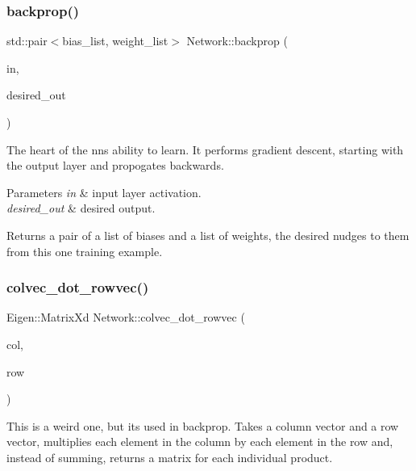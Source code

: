 \subsubsection{\texorpdfstring{backprop()}{backprop()}}
{\footnotesize\ttfamily std\+::pair$<$bias\+\_\+list, weight\+\_\+list$>$ Network\+::backprop (\begin{DoxyParamCaption}\item[{Eigen\+::\+Vector\+Xd \&}]{in,  }\item[{Eigen\+::\+Vector\+Xd \&}]{desired\+\_\+out }\end{DoxyParamCaption})}

The heart of the nn\textquotesingle{}s ability to learn. It performs gradient descent, starting with the output layer and propogates backwards.


\begin{DoxyParams}{Parameters}
{\em in} & input layer activation. \\
\hline
{\em desired\+\_\+out} & desired output. \\
\hline
\end{DoxyParams}
\begin{DoxyReturn}{Returns}
a pair of a list of biases and a list of weights, the desired nudges to them from this one training example. 
\end{DoxyReturn}
\mbox{\label{classNetwork_a97f385db3fd78d16a73a7f8b2d18f968}} 
\subsubsection{\texorpdfstring{colvec\+\_\+dot\+\_\+rowvec()}{colvec\_dot\_rowvec()}}
{\footnotesize\ttfamily Eigen\+::\+Matrix\+Xd Network\+::colvec\+\_\+dot\+\_\+rowvec (\begin{DoxyParamCaption}\item[{Eigen\+::\+Vector\+Xd}]{col,  }\item[{Eigen\+::\+Vector\+Xd}]{row }\end{DoxyParamCaption})}

This is a weird one, but it\textquotesingle{}s used in backprop. Takes a column vector and a row vector, multiplies each element in the column by each element in the row and, instead of summing, returns a matrix for each individual product.


